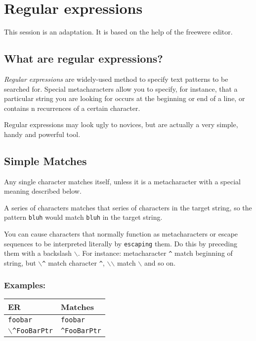 
\hypertarget{working_regularexpressions}{}
\section{Regular expressions}

This session is an adaptation. It is based on the help of the
freewere  editor.


\subsection{What are regular expressions?}

\textit{Regular expressions} are widely-used method to specify text patterns
to be searched for. Special metacharacters allow you to specify, for
instance, that a particular string you are looking for occurs at the
beginning or end of a line, or contains n recurrences of a certain character.

Regular expressions may look ugly to novices, but are actually a very simple,
handy and powerful tool.


\subsection{Simple Matches}

Any single character matches itself, unless it is a metacharacter with a
special meaning described below.

A series of characters matches that series of characters in the target
string, so the pattern \texttt{bluh} would match \texttt{bluh} in the
target string.

You can cause characters that normally function as metacharacters or
escape sequences to be interpreted literally by \texttt{escaping} them.
Do this by preceding them with a backslash \texttt{$\backslash$}. For
instance: metacharacter \texttt{\^{}} match beginning of string, but
\texttt{$\backslash$\^{}} match character \texttt{\^{}},
\texttt{$\backslash$$\backslash$} match \texttt{$\backslash$} and so on.


\subsubsection{Examples:}

\begin{footnotesize}
  \begin{tabularx}{\textwidth}{>{\hsize=0.3\hsize}X>{\hsize=0.7\hsize}X}\\
    \hline
    \textbf{ER} & \textbf{Matches} \\
    \hline
    \texttt{foobar} & \texttt{foobar} \\
    \texttt{$\backslash$\^{}FooBarPtr} & \texttt{\^{}FooBarPtr} \\
    \hline
  \end{tabularx}
\end{footnotesize}


